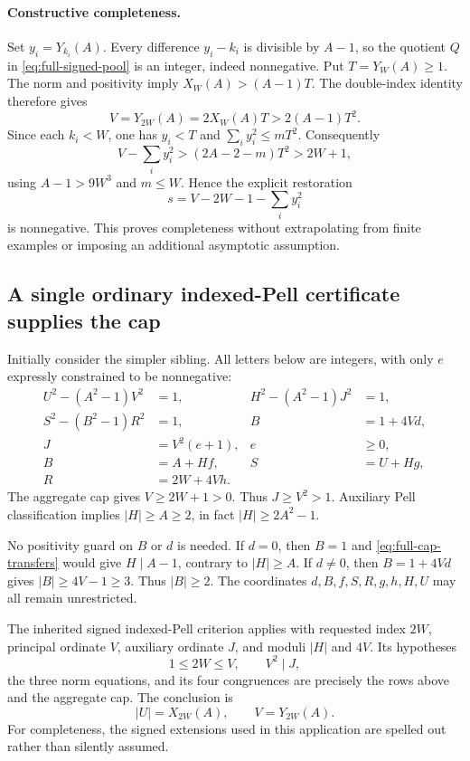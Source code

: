 \paragraph{Constructive completeness.}
Set $y_i=Y_{k_i}(A)$. Every difference $y_i-k_i$ is divisible by
$A-1$, so the quotient $Q$ in \eqref{eq:full-signed-pool} is an
integer, indeed nonnegative. Put $T=Y_W(A)\geq1$. The norm and
positivity imply $X_W(A)>(A-1)T$. The double-index identity therefore
gives
\[
 V=Y_{2W}(A)=2X_W(A)T>2(A-1)T^2.
\]
Since each $k_i<W$, one has $y_i<T$ and
$\sum_i y_i^2\leq mT^2$. Consequently
\[
 V-\sum_i y_i^2>(2A-2-m)T^2>2W+1,
\]
using $A-1>9W^3$ and $m\leq W$. Hence the explicit restoration
\[
 s=V-2W-1-\sum_i y_i^2
\]
is nonnegative. This proves completeness without extrapolating from
finite examples or imposing an additional asymptotic assumption.

\subsection{A single ordinary indexed-Pell certificate supplies the cap}
Initially consider the simpler sibling. All letters below are integers,
with only $e$ expressly constrained to be nonnegative:
\begin{align}
 U^2-(A^2-1)V^2&=1, &
 H^2-(A^2-1)J^2&=1, \label{eq:full-cap-norms}\\
 S^2-(B^2-1)R^2&=1, &
 B&=1+4Vd, \label{eq:full-cap-comparison}\\
 J&=V^2(e+1), & e&\geq0, \label{eq:full-positive-aux}\\
 B&=A+Hf, & S&=U+Hg, \label{eq:full-cap-transfers}\\
 R&=2W+4Vh. && \label{eq:full-cap-index}
\end{align}
The aggregate cap gives $V\geq2W+1>0$. Thus $J\geq V^2>1$.
Auxiliary Pell classification implies $|H|\geq A\geq2$, in fact
$|H|\geq2A^2-1$.

No positivity guard on $B$ or $d$ is needed. If $d=0$, then $B=1$
and \eqref{eq:full-cap-transfers} would give $H\mid A-1$, contrary
to $|H|\geq A$. If $d\ne0$, then $B=1+4Vd$ gives
$|B|\geq4V-1\geq3$. Thus $|B|\geq2$. The coordinates
$d,B,f,S,R,g,h,H,U$ may all remain unrestricted.

The inherited signed indexed-Pell criterion applies with requested
index $2W$, principal ordinate $V$, auxiliary ordinate $J$, and
moduli $|H|$ and $4V$. Its hypotheses
\[
 1\leq2W\leq V,\qquad V^2\mid J,
\]
the three norm equations, and its four congruences are precisely the
rows above and the aggregate cap. The conclusion is
\[
 |U|=X_{2W}(A),\qquad V=Y_{2W}(A).
\]
For completeness, the signed extensions used in this application are
spelled out rather than silently assumed.

